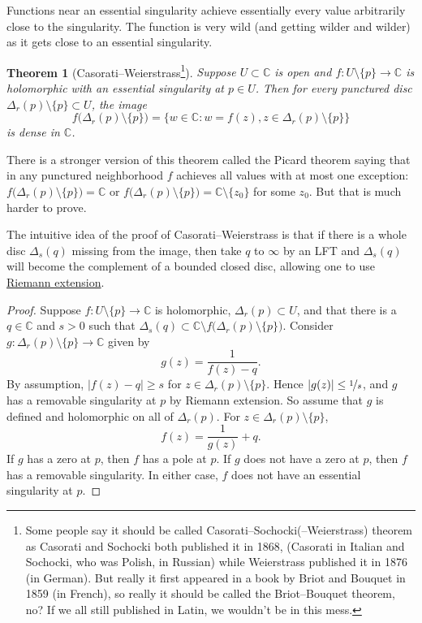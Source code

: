 \documentclass[12pt,openany]{book}
\newcommand{\sabs}[1]{\lvert {#1} \rvert}
\newcommand{\C}{{\mathbb{C}}}
\theoremstyle{plain}
\newtheorem{thm}{Theorem}[section]
\theoremstyle{remark}
\theoremstyle{definition}
\theoremstyle{exercise}
\theoremstyle{example}
\begin{document}
Functions near an essential singularity achieve essentially every value
arbitrarily close to the singularity.  The function is very wild (and
getting wilder and wilder) as it gets close to an essential singularity.

\begin{thm}[Casorati--Weierstrass\footnote{%
Some people say it should be called Casorati--Sochocki(--Weierstrass) theorem as
Casorati and Sochocki both published it in 1868, (Casorati in Italian
and Sochocki, who was Polish, in Russian) while Weierstrass published it in 1876 (in
German).  But really it first appeared in a book by Briot and Bouquet in
1859 (in French), so really it should be called the Briot--Bouquet theorem,
no?  If we all still published in Latin, we wouldn't be in this
mess.}]\label{thm:casoratiweierstrass}
Suppose $U \subset \C$ is open and $f \colon U \setminus \{ p \} \to \C$ is
holomorphic with
an essential singularity at $p \in U$.  Then for every punctured disc
$\Delta_r(p) \setminus \{ p \} \subset U$, the image
\begin{equation*}
f\bigl(\Delta_r(p) \setminus \{ p \} \bigr)
=
\bigl\{ w \in \C : w = f(z), z \in \Delta_r(p) \setminus \{ p \} \bigr\}
\end{equation*}
is dense in $\C$.
\end{thm}

There is a stronger version
of this theorem called the Picard theorem saying that in any
punctured neighborhood $f$ achieves all values with at most one exception:
$f\bigl(\Delta_r(p) \setminus \{ p \} \bigr) = \C$ or 
$f\bigl(\Delta_r(p) \setminus \{ p \} \bigr) = \C \setminus \{ z_0 \}$ for
some $z_0$.
But that is much harder to prove.

The intuitive idea of the proof of Casorati--Weierstrass is that if there
is a whole disc $\Delta_s(q)$ missing from the image, then take $q$ to
$\infty$ by an LFT and $\Delta_s(q)$ will become the complement of a bounded
closed disc, allowing one to use
\hyperref[thm:riemannext]{Riemann extension}.

\begin{proof}
Suppose $f \colon U \setminus \{ p \} \to \C$ is holomorphic,
$\Delta_r(p) \subset U$,
and that
there is a $q \in \C$ and $s > 0$ such that $\Delta_s(q) \subset \C
\setminus 
f\bigl(\Delta_r(p) \setminus \{ p \} \bigr)$.
Consider $g \colon \Delta_r(p) \setminus \{p\} \to \C$ given by
\begin{equation*}
g(z) = \frac{1}{f(z) - q} .
\end{equation*}
By assumption, $\sabs{f(z)-q} \geq s$ for $z \in \Delta_r(p) \setminus
\{p\}$.
Hence $\sabs{g(z)} \leq \nicefrac{1}{s}$, and $g$ has a removable
singularity at $p$ by Riemann extension.  So
assume that $g$ is defined and holomorphic on all of
$\Delta_r(p)$.  For $z \in \Delta_r(p) \setminus \{ p \}$,
\begin{equation*}
f(z) = \frac{1}{g(z)} + q .
\end{equation*}
If $g$ has a zero at $p$, then $f$ has a pole at $p$.  If $g$ does not
have a zero at $p$, then $f$ has a removable singularity.  In either case,
$f$ does not have an essential singularity at $p$.
\end{proof}
\end{document}
